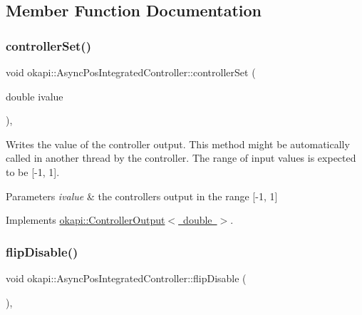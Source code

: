 \subsection{Member Function Documentation}
\mbox{\label{classokapi_1_1AsyncPosIntegratedController_aaa8d694c814e7b419dfb55b3e3a1d72e}} 
\subsubsection{\texorpdfstring{controllerSet()}{controllerSet()}}
{\footnotesize\ttfamily void okapi\+::\+Async\+Pos\+Integrated\+Controller\+::controller\+Set (\begin{DoxyParamCaption}\item[{double}]{ivalue }\end{DoxyParamCaption})\hspace{0.3cm}{\ttfamily [override]}, {\ttfamily [virtual]}}

Writes the value of the controller output. This method might be automatically called in another thread by the controller. The range of input values is expected to be \mbox{[}-\/1, 1\mbox{]}.


\begin{DoxyParams}{Parameters}
{\em ivalue} & the controller\textquotesingle{}s output in the range \mbox{[}-\/1, 1\mbox{]} \\
\hline
\end{DoxyParams}


Implements \mbox{\hyperlink{classokapi_1_1ControllerOutput_a360c08f0c10b36f882d6d3100c2cad49}{okapi\+::\+Controller\+Output$<$ double $>$}}.

\mbox{\label{classokapi_1_1AsyncPosIntegratedController_a95c0b1350a2287e72d6517acdb8082b1}} 
\subsubsection{\texorpdfstring{flipDisable()}{flipDisable()}\hspace{0.1cm}{\footnotesize\ttfamily [1/2]}}
{\footnotesize\ttfamily void okapi\+::\+Async\+Pos\+Integrated\+Controller\+::flip\+Disable (\begin{DoxyParamCaption}{ }\end{DoxyParamCaption})\hspace{0.3cm}{\ttfamily [override]}, {\ttfamily [virtual]}}

